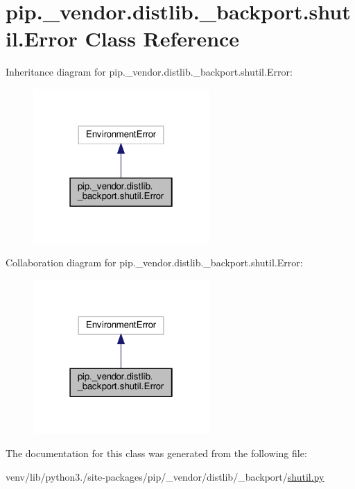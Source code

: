\hypertarget{classpip_1_1__vendor_1_1distlib_1_1__backport_1_1shutil_1_1Error}{}\section{pip.\+\_\+vendor.\+distlib.\+\_\+backport.\+shutil.\+Error Class Reference}
\label{classpip_1_1__vendor_1_1distlib_1_1__backport_1_1shutil_1_1Error}


Inheritance diagram for pip.\+\_\+vendor.\+distlib.\+\_\+backport.\+shutil.\+Error\+:
\nopagebreak
\begin{figure}[H]
\begin{center}
\leavevmode
\includegraphics[width=190pt]{classpip_1_1__vendor_1_1distlib_1_1__backport_1_1shutil_1_1Error__inherit__graph}
\end{center}
\end{figure}


Collaboration diagram for pip.\+\_\+vendor.\+distlib.\+\_\+backport.\+shutil.\+Error\+:
\nopagebreak
\begin{figure}[H]
\begin{center}
\leavevmode
\includegraphics[width=190pt]{classpip_1_1__vendor_1_1distlib_1_1__backport_1_1shutil_1_1Error__coll__graph}
\end{center}
\end{figure}


The documentation for this class was generated from the following file\+:\begin{DoxyCompactItemize}
\item 
venv/lib/python3./site-\/packages/pip/\+\_\+vendor/distlib/\+\_\+backport/\hyperlink{shutil_8py}{shutil.\+py}\end{DoxyCompactItemize}
